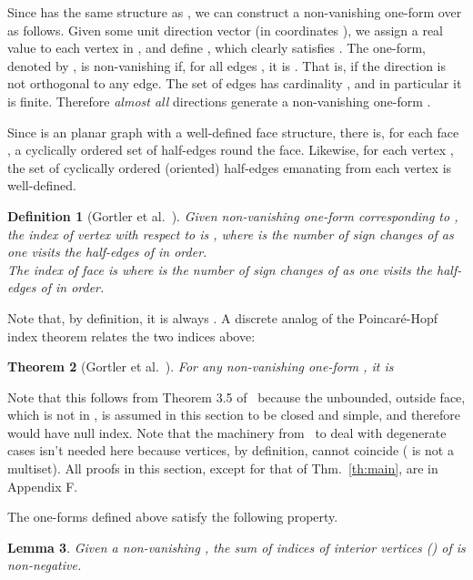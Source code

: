\documentclass[11pt]{article}
\newtheorem{theorem}{Theorem}[section]
\newtheorem{lemma}[theorem]{Lemma}
\newtheorem{definition}[theorem]{Definition}
\begin{document}
Since  has the same structure as , we can construct a non-vanishing one-form
over  as follows. 
Given some unit direction vector 
(in coordinates ), 
we assign a real
value  to each vertex  in , and define 
, which clearly satisfies 
. The one-form, denoted by , 
is non-vanishing if, for all edges , 
it is . 
That is, if the direction  is not orthogonal to any edge. 
The set of edges has cardinality , and in particular
it is finite. Therefore \emph{almost all} directions  generate a non-vanishing one-form . 






Since  is an planar graph with a well-defined face structure,
there is, for each face , a cyclically ordered set
 of half-edges round the face. 
Likewise, for each vertex , the set  of cyclically ordered
(oriented) half-edges emanating from each vertex is well-defined. 


\begin{definition}[Gortler et al.\ \cite{1form}]
Given non-vanishing one-form  corresponding to , 
the index of vertex  with respect to  is , where  is the
number of sign changes of  as one visits the half-edges of  in order. \\
The index of face  is  where  is the number
of sign changes of  as one visits the half-edges of  in
order. 
\end{definition}

Note that, by definition, it is always . 
A discrete analog of the Poincar\'e-Hopf index theorem relates 
the two indices above:

\begin{theorem}[Gortler et al.\ \cite{1form}]\label{lem:ph}
For any non-vanishing one-form , it is 

\end{theorem}

Note that this follows from Theorem 3.5 of~\cite{1form} because the unbounded, 
outside face, which is not in , is assumed in this section to be closed and simple, and therefore would have null index. Note that the machinery from~\cite{1form} to deal with degenerate cases
isn't needed here because vertices, by definition, cannot coincide ( is not a multiset). 
All  proofs in this section, except for that of Thm.~\ref{th:main}, are  in Appendix F. 





The one-forms defined above satisfy the following property. 

\begin{lemma}\label{lem:non-negative}
	Given a non-vanishing , the sum of indices of interior vertices () of  is non-negative. 
\end{lemma}
\end{document}
